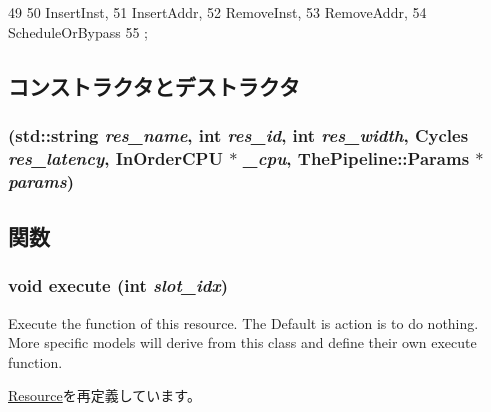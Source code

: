 \begin{DoxyCode}
49                  {
50         InsertInst,
51         InsertAddr,
52         RemoveInst,
53         RemoveAddr,
54         ScheduleOrBypass
55     };
\end{DoxyCode}


\subsection{コンストラクタとデストラクタ}
\hypertarget{classInstBuffer_aed5f553acf1f60008e3cc5575617b8db}{
\subsubsection[{InstBuffer}]{ (std::string {\em res\_\-name}, \/  int {\em res\_\-id}, \/  int {\em res\_\-width}, \/  {\bf Cycles} {\em res\_\-latency}, \/  {\bf InOrderCPU} $\ast$ {\em \_\-cpu}, \/  {\bf ThePipeline::Params} $\ast$ {\em params})}}
\label{classInstBuffer_aed5f553acf1f60008e3cc5575617b8db}


\subsection{関数}
\hypertarget{classInstBuffer_a7b7fff82f8c9cbdb02add1346f60bb9e}{
\subsubsection[{execute}]{\setlength{\rightskip}{0pt plus 5cm}void execute (int {\em slot\_\-idx})}}
\label{classInstBuffer_a7b7fff82f8c9cbdb02add1346f60bb9e}
Execute the function of this resource. The Default is action is to do nothing. More specific models will derive from this class and define their own execute function. 

\hyperlink{classResource_a39af49c5568d1db3f53c12d7d6914c32}{Resource}を再定義しています。


